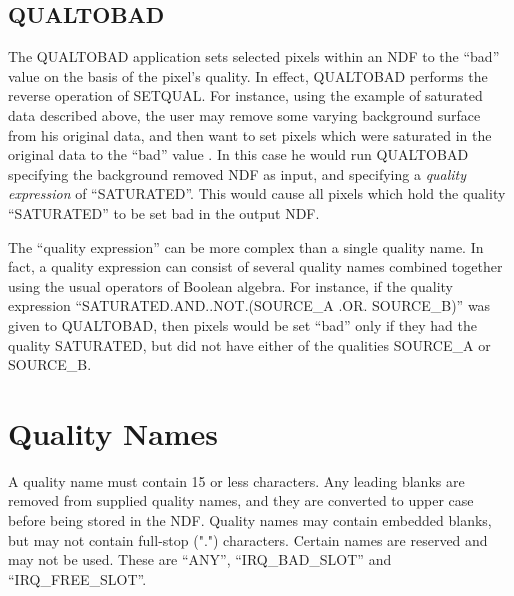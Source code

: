 \subsection{QUALTOBAD}
The QUALTOBAD application sets selected pixels within an NDF to the ``bad''
value on the basis of the pixel's quality. In effect, QUALTOBAD performs the
reverse operation of SETQUAL. For instance, using the example of saturated data
described above, the user may remove some varying background surface from his
original data, and then want to set pixels which were saturated in the original
data to the ``bad'' value . In this case he would run QUALTOBAD specifying the
background removed NDF as input, and specifying a {\em quality expression} of
``SATURATED''. This would cause all pixels which hold the quality ``SATURATED''
to be set bad in the output NDF. 

The ``quality expression'' can be more complex than a single quality name. In 
fact, a quality expression can consist of several quality names combined 
together using the usual operators of Boolean algebra. For instance, if the
quality expression ``SATURATED.AND..NOT.(SOURCE\_A .OR. SOURCE\_B)'' was given to 
QUALTOBAD, then pixels would be set ``bad'' only if they had the quality 
SATURATED, but did not have either of the qualities SOURCE\_A or SOURCE\_B.

\section{Quality Names}
A quality name must contain 15 or less characters. Any leading blanks are
removed from supplied quality names, and they are converted to upper case before
being stored in the NDF. Quality names may contain embedded blanks, but may not 
contain full-stop (".") characters. Certain names are reserved and may not be 
used. These are ``ANY'', ``IRQ\_BAD\_SLOT'' and ``IRQ\_FREE\_SLOT''.

